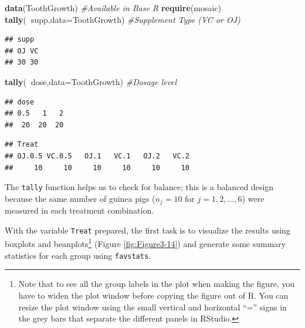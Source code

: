 \documentclass[]{book}
\newenvironment{Shaded}{\begin{snugshade}}{\end{snugshade}}
\newcommand{\KeywordTok}[1]{\textcolor[rgb]{0.13,0.29,0.53}{\textbf{#1}}}
\newcommand{\DataTypeTok}[1]{\textcolor[rgb]{0.13,0.29,0.53}{#1}}
\newcommand{\CommentTok}[1]{\textcolor[rgb]{0.56,0.35,0.01}{\textit{#1}}}
\newcommand{\OperatorTok}[1]{\textcolor[rgb]{0.81,0.36,0.00}{\textbf{#1}}}
\newcommand{\NormalTok}[1]{#1}
\let\rmarkdownfootnote\footnote%
\def\footnote{\protect\rmarkdownfootnote}
\begin{document}
\begin{Shaded}
\begin{Highlighting}[]
\KeywordTok{data}\NormalTok{(ToothGrowth) }\CommentTok{#Available in Base R}
\KeywordTok{require}\NormalTok{(mosaic)}
\KeywordTok{tally}\NormalTok{(}\OperatorTok{~}\NormalTok{supp,}\DataTypeTok{data=}\NormalTok{ToothGrowth) }\CommentTok{#Supplement Type (VC or OJ)}
\end{Highlighting}
\end{Shaded}

\begin{verbatim}
## supp
## OJ VC 
## 30 30
\end{verbatim}

\begin{Shaded}
\begin{Highlighting}[]
\KeywordTok{tally}\NormalTok{(}\OperatorTok{~}\NormalTok{dose,}\DataTypeTok{data=}\NormalTok{ToothGrowth) }\CommentTok{#Dosage level}
\end{Highlighting}
\end{Shaded}

\begin{verbatim}
## dose
## 0.5   1   2 
##  20  20  20
\end{verbatim}

\begin{Shaded}
\end{Shaded}

\begin{verbatim}
## Treat
## OJ.0.5 VC.0.5   OJ.1   VC.1   OJ.2   VC.2 
##     10     10     10     10     10     10
\end{verbatim}

The \texttt{tally} function helps us to check for balance; this is a
balanced design because the same number of guinea pigs
(\(n_j=10 \text{ for } j=1, 2,\ldots, 6\)) were measured in each
treatment combination.

With the variable \texttt{Treat} prepared, the first task is to
visualize the results using boxplots and beanplots\footnote{Note that to
  see all the group labels in the plot when making the figure, you have
  to widen the plot window before copying the figure out of R. You can
  resize the plot window using the small vertical and horizontal ``=''
  signs in the grey bars that separate the different panels in RStudio.}
(Figure \ref{fig:Figure3-14}) and generate some summary statistics for
each group using \texttt{favstats}.
\end{document}
